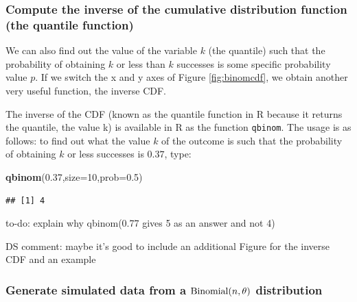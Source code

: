 \documentclass[12pt,]{krantz}
\makeatletter
\newenvironment{Shaded}{\begin{snugshade}}{\end{snugshade}}
\newcommand{\DataTypeTok}[1]{\textcolor[rgb]{0.13,0.29,0.53}{#1}}
\newcommand{\DecValTok}[1]{\textcolor[rgb]{0.00,0.00,0.81}{#1}}
\newcommand{\FloatTok}[1]{\textcolor[rgb]{0.00,0.00,0.81}{#1}}
\newcommand{\KeywordTok}[1]{\textcolor[rgb]{0.13,0.29,0.53}{\textbf{#1}}}
\newcommand{\NormalTok}[1]{#1}
\newenvironment{kframe}{%
\medskip{}
\setlength{\fboxsep}{.8em}
 \def\at@end@of@kframe{}%
 \ifinner\ifhmode%
  \def\at@end@of@kframe{\end{minipage}}%
  \begin{minipage}{\columnwidth}%
 \fi\fi%
 \def\FrameCommand##1{\hskip\@totalleftmargin \hskip-\fboxsep
 \colorbox{shadecolor}{##1}\hskip-\fboxsep
     \hskip-\linewidth \hskip-\@totalleftmargin \hskip\columnwidth}%
 \MakeFramed {\advance\hsize-\width
   \@totalleftmargin\z@ \linewidth\hsize
   \@setminipage}}%
 {\par\unskip\endMakeFramed%
 \at@end@of@kframe}
\newenvironment{rmdblock}[1]
  {
  \begin{itemize}
  \renewcommand{\labelitemi}{
    \raisebox{-.7\height}[0pt][0pt]{
      {\setkeys{Gin}{width=3em,keepaspectratio}\texttt{[image: images/\#1]}}
    }
  }
  \setlength{\fboxsep}{1em}
  \begin{kframe}
  \item
  }
  {
  \end{kframe}
  \end{itemize}
  }
\newenvironment{rmdnote}
  {\begin{rmdblock}{note}}
  {\end{rmdblock}}
\theoremstyle{definition}
\theoremstyle{definition}
\theoremstyle{definition}
\theoremstyle{remark}
\makeatother
\begin{document}
\hypertarget{compute-the-inverse-of-the-cumulative-distribution-function-the-quantile-function}{%
\subsubsection{Compute the inverse of the cumulative distribution function (the quantile function)}\label{compute-the-inverse-of-the-cumulative-distribution-function-the-quantile-function}}

We can also find out the value of the variable \(k\) (the quantile) such that the probability of obtaining \(k\) or less than \(k\) successes is some specific probability value \(p\). If we switch the x and y axes of Figure \ref{fig:binomcdf}, we obtain another very useful function, the inverse CDF.

The inverse of the CDF (known as the quantile function in R because it returns the quantile, the value k) is available in R as the function \texttt{qbinom}. The usage is as follows: to find out what the value \(k\) of the outcome is such that the probability of obtaining \(k\) or less successes is \(0.37\), type:

\begin{Shaded}
\begin{Highlighting}[]
\KeywordTok{qbinom}\NormalTok{(}\FloatTok{0.37}\NormalTok{,}\DataTypeTok{size=}\DecValTok{10}\NormalTok{,}\DataTypeTok{prob=}\FloatTok{0.5}\NormalTok{)}
\end{Highlighting}
\end{Shaded}

\begin{verbatim}
## [1] 4
\end{verbatim}

\begin{rmdnote}
to-do: explain why qbinom(0.77 gives 5 as an answer and not 4)
\end{rmdnote}

\begin{rmdnote}
DS comment: maybe it's good to include an additional Figure for the inverse CDF and an example
\end{rmdnote}

\hypertarget{generate-simulated-data-from-a-hboxbinomialntheta-distribution}{%
\subsubsection{\texorpdfstring{Generate simulated data from a \(\hbox{Binomial}(n,\theta)\) distribution}{Generate simulated data from a \textbackslash{}hbox\{Binomial\}(n,\textbackslash{}theta) distribution}}\label{generate-simulated-data-from-a-hboxbinomialntheta-distribution}}
\end{document}
